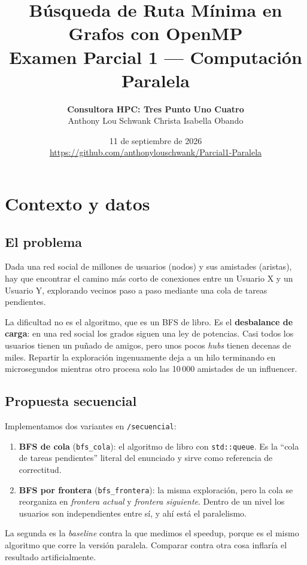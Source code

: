 \documentclass[11pt,a4paper]{article}
\title{\vspace{-1.5cm}\textbf{Búsqueda de Ruta Mínima en Grafos con OpenMP}\\[0.3em]
\large Examen Parcial 1 --- Computación Paralela}
\author{\textbf{Consultora HPC: Tres Punto Uno Cuatro}\\[0.6em]
Anthony Lou Schwank \quad\textbullet\quad Christa Isabella Obando}
\date{11 de septiembre de 2026\\[0.4em]
\small\url{https://github.com/anthonylouschwank/Parcial1-Paralela}}
\begin{document}
\maketitle

\section{Contexto y datos}

\subsection*{El problema}

Dada una red social de millones de usuarios (nodos) y sus amistades (aristas),
hay que encontrar el camino más corto de conexiones entre un Usuario X y un
Usuario Y, explorando vecinos paso a paso mediante una cola de tareas
pendientes.

La dificultad no es el algoritmo, que es un BFS de libro. Es el
\textbf{desbalance de carga}: en una red social los grados siguen una ley de
potencias. Casi todos los usuarios tienen un puñado de amigos, pero unos pocos
\emph{hubs} tienen decenas de miles. Repartir la exploración ingenuamente deja
a un hilo terminando en microsegundos mientras otro procesa solo las 10\,000
amistades de un influencer.

\subsection*{Propuesta secuencial}

Implementamos dos variantes en \texttt{/secuencial}:

\begin{enumerate}
\item \textbf{BFS de cola} (\texttt{bfs\_cola}): el algoritmo de libro con
      \texttt{std::queue}. Es la ``cola de tareas pendientes'' literal del
      enunciado y sirve como referencia de correctitud.
\item \textbf{BFS por frontera} (\texttt{bfs\_frontera}): la misma exploración,
      pero la cola se reorganiza en \emph{frontera actual} y \emph{frontera
      siguiente}. Dentro de un nivel los usuarios son independientes entre sí,
      y ahí está el paralelismo.
\end{enumerate}

La segunda es la \emph{baseline} contra la que medimos el speedup, porque es el
mismo algoritmo que corre la versión paralela. Comparar contra otra cosa
inflaría el resultado artificialmente.
\end{document}
